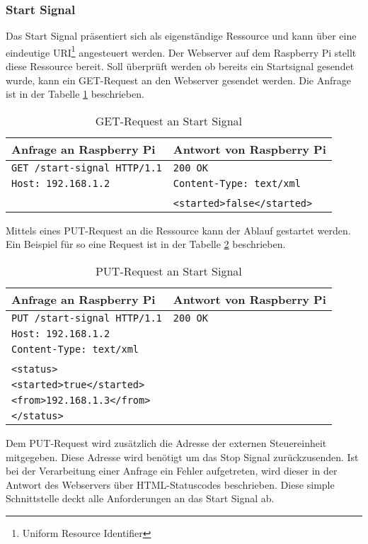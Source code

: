 \subsubsection{Start Signal}
Das Start Signal präsentiert sich als eigenständige Ressource und kann über eine eindeutige URI\footnote{Uniform Resource Identifier} angesteuert werden. Der Webserver auf dem Raspberry Pi stellt diese Ressource bereit. Soll überprüft werden ob bereits ein Startsignal gesendet wurde, kann ein GET-Request an den Webserver gesendet werden. Die Anfrage ist in der Tabelle \ref{tab:get-start-signal} beschrieben.

\begin{table}[h!]
	\centering
	\begin{tabular}{|l|l|}
		\hline Anfrage an Raspberry Pi 			 & Antwort von Raspberry Pi 	  \\ 
		\hline \verb|GET /start-signal HTTP/1.1| & \verb|200 OK| 				  \\
			   \verb|Host: 192.168.1.2| 		 & \verb|Content-Type: text/xml|  \\
			   									 &  							  \\
			   									 & \verb|<started>false</started>| \\ 
		\hline 
	\end{tabular} 
	\caption{GET-Request an Start Signal}
	\label{tab:get-start-signal}
\end{table}

Mittels eines PUT-Request an die Ressource kann der Ablauf gestartet werden. Ein Beispiel für so eine Request ist in der Tabelle \ref{tab:put-start-signal} beschrieben.

\begin{table}[h!]
	\centering
	\begin{tabular}{|l|l|}
		\hline Anfrage an Raspberry Pi 			 & Antwort von Raspberry Pi \\ 
		\hline \verb|PUT /start-signal HTTP/1.1| & \verb|200 OK| 			\\
			   \verb|Host: 192.168.1.2| 		 & 							\\
			   \verb|Content-Type: text/xml|	 &  						\\
			   									 &  						\\
			   \verb|<status>|	 				 &  						\\
			   \verb|<started>true</started>|	 &  						\\
			   \verb|<from>192.168.1.3</from>|	 &  						\\
			   \verb|</status>|	 				 &  						\\ 
		\hline 
	\end{tabular} 
	\caption{PUT-Request an Start Signal}
	\label{tab:put-start-signal}
\end{table}

Dem PUT-Request wird zusätzlich die Adresse der externen Steuereinheit mitgegeben. Diese Adresse wird benötigt um das Stop Signal zurückzusenden. Ist bei der Verarbeitung einer Anfrage ein Fehler aufgetreten, wird dieser in der Antwort des Webservers über HTML-Statuscodes beschrieben. Diese simple Schnittstelle deckt alle Anforderungen an das Start Signal ab.